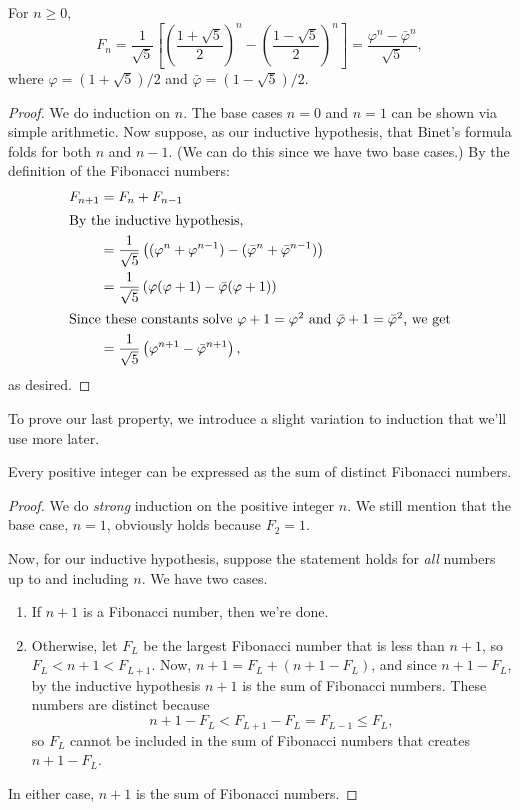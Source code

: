 \documentclass[../m055main.tex]{subfiles}
\begin{document}
\begin{theorem}
    For $n \geq 0$, \vspace{-6pt}
    \[ F_n = \frac{1}{\sqrt{5}} \left[ \left( \frac{1 + \sqrt{5}}{2} \right)^{n} - \left( \frac{1 - \sqrt{5}}{2} \right)^{n} \right] = \frac{\varphi^{n} - \bar{\varphi}^{n}}{\sqrt{5}}, \]
    where $\varphi = (1 + \sqrt{5}) / 2$ and $\bar{\varphi} = (1 - \sqrt{5}) / 2$.
\end{theorem}

\begin{proof}
    We do induction on $n$.
    The base cases $n=0$ and $n=1$ can be shown via simple arithmetic.
    Now suppose, as our inductive hypothesis, that Binet's formula folds for both $n$ and $n-1$.
    (We can do this since we have two base cases.)
    By the definition of the Fibonacci numbers:
    \begin{align*}
        F_{n+1} &= F_n + F_{n-1} \\
        \intertext{By the inductive hypothesis,}
        &= \frac{1}{\sqrt{5}} \left( (\varphi^{n} + \varphi^{n-1}) - (\bar{\varphi}^{n} + \bar{\varphi}^{n-1}) \right) \\
        &= \frac{1}{\sqrt{5}} \left( \varphi (\varphi + 1) - \bar{\varphi}({\varphi} + 1) \right) \\
        \intertext{Since these constants solve $\varphi + 1 = \varphi^2$ and $\bar{\varphi} + 1 = \bar{\varphi}^2$, we get}
        &= \frac{1}{\sqrt{5}} \left( \varphi^{n+1} - \bar{\varphi}^{n+1} \right),
    \end{align*}
    as desired.
\end{proof}

To prove our last property, we introduce a slight variation to induction that we'll use more later.

\begin{theorem}
    Every positive integer can be expressed as the sum of distinct Fibonacci numbers.
\end{theorem}

\begin{proof}
    We do \textit{strong} induction on the positive integer $n$.
    We still mention that the base case, $n=1$, obviously holds because $F_2 = 1$.

    Now, for our inductive hypothesis, suppose the statement holds for \textit{all} numbers up to and including $n$.
    We have two cases.
    \begin{enumerate}[label=(\alph*)]
        \item If $n+1$ is a Fibonacci number, then we're done.
        \item Otherwise, let $F_L$ be the largest Fibonacci number that is less than $n+1$, so $F_L < n+1 < F_{L+1}$.
        Now, $n+1 = F_L + (n+1 - F_L)$, and since $n + 1 - F_L$, by the inductive hypothesis $n+1$ is the sum of Fibonacci numbers.
        These numbers are distinct because
        \[ n+1 - F_L < F_{L+1} - F_L = F_{L-1} \leq F_L, \]
        so $F_L$ cannot be included in the sum of Fibonacci numbers that creates $n+1 - F_L$.
    \end{enumerate}
    In either case, $n+1$ is the sum of Fibonacci numbers.
\end{proof}
\end{document}
